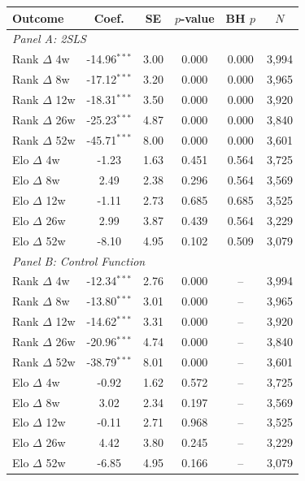 \begin{tabular}{lccccc}
\toprule
Outcome & Coef. & SE & $p$-value & BH $p$ & $N$ \\
\midrule
\multicolumn{6}{l}{\textit{Panel A: 2SLS}} \\
Rank $\Delta$ 4w & -14.96$^{***}$ & 3.00 & 0.000 & 0.000 & 3,994 \\
Rank $\Delta$ 8w & -17.12$^{***}$ & 3.20 & 0.000 & 0.000 & 3,965 \\
Rank $\Delta$ 12w & -18.31$^{***}$ & 3.50 & 0.000 & 0.000 & 3,920 \\
Rank $\Delta$ 26w & -25.23$^{***}$ & 4.87 & 0.000 & 0.000 & 3,840 \\
Rank $\Delta$ 52w & -45.71$^{***}$ & 8.00 & 0.000 & 0.000 & 3,601 \\
Elo $\Delta$ 4w & -1.23 & 1.63 & 0.451 & 0.564 & 3,725 \\
Elo $\Delta$ 8w & 2.49 & 2.38 & 0.296 & 0.564 & 3,569 \\
Elo $\Delta$ 12w & -1.11 & 2.73 & 0.685 & 0.685 & 3,525 \\
Elo $\Delta$ 26w & 2.99 & 3.87 & 0.439 & 0.564 & 3,229 \\
Elo $\Delta$ 52w & -8.10 & 4.95 & 0.102 & 0.509 & 3,079 \\
\midrule
\multicolumn{6}{l}{\textit{Panel B: Control Function}} \\
Rank $\Delta$ 4w & -12.34$^{***}$ & 2.76 & 0.000 & -- & 3,994 \\
Rank $\Delta$ 8w & -13.80$^{***}$ & 3.01 & 0.000 & -- & 3,965 \\
Rank $\Delta$ 12w & -14.62$^{***}$ & 3.31 & 0.000 & -- & 3,920 \\
Rank $\Delta$ 26w & -20.96$^{***}$ & 4.74 & 0.000 & -- & 3,840 \\
Rank $\Delta$ 52w & -38.79$^{***}$ & 8.01 & 0.000 & -- & 3,601 \\
Elo $\Delta$ 4w & -0.92 & 1.62 & 0.572 & -- & 3,725 \\
Elo $\Delta$ 8w & 3.02 & 2.34 & 0.197 & -- & 3,569 \\
Elo $\Delta$ 12w & -0.11 & 2.71 & 0.968 & -- & 3,525 \\
Elo $\Delta$ 26w & 4.42 & 3.80 & 0.245 & -- & 3,229 \\
Elo $\Delta$ 52w & -6.85 & 4.95 & 0.166 & -- & 3,079 \\
\bottomrule
\end{tabular}

